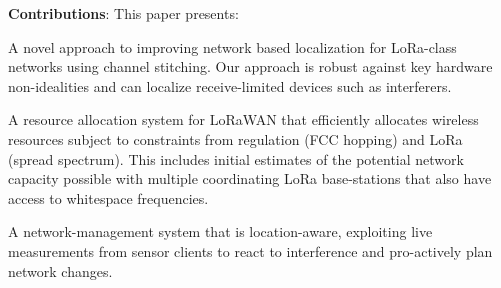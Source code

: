\textbf{Contributions}: This paper presents:
\begin{tightitem}
\item A novel approach to  improving network based localization for LoRa-class networks using channel stitching.  Our approach is robust against key hardware non-idealities and can localize receive-limited devices such as interferers.
\item A resource allocation system for LoRaWAN that efficiently allocates wireless resources subject to constraints from regulation (FCC hopping) and LoRa (spread spectrum).  This includes initial estimates of the potential network capacity possible with multiple coordinating LoRa base-stations that also have access to whitespace frequencies.
\item A network-management system that is location-aware, exploiting live measurements from sensor clients to react to interference and pro-actively plan network changes.     
\end{tightitem}
